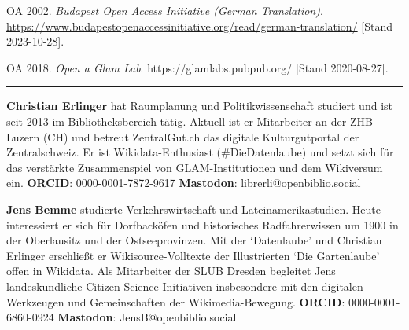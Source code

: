 \documentclass[a4paper,
fontsize=11pt,
oneside,
numbers=noperiodatend,
parskip=half-,
bibliography=totoc,
final
]{scrartcl}
\begin{document}
OA 2002. \emph{Budapest Open Access Initiative (German Translation)}.
\url{https://www.budapestopenaccessinitiative.org/read/german-translation/}
{[}Stand 2023-10-28{]}.

OA 2018. \emph{Open a Glam Lab}. https://glamlabs.pubpub.org/ {[}Stand
2020-08-27{]}.

\begin{center}\rule{0.5\linewidth}{0.5pt}\end{center}

\textbf{Christian Erlinger} hat Raumplanung und Politikwissenschaft
studiert und ist seit 2013 im Bibliotheksbereich tätig. Aktuell ist er
Mitarbeiter an der ZHB Luzern (CH) und betreut ZentralGut.ch das
digitale Kulturgutportal der Zentralschweiz. Er ist Wikidata-Enthusiast
(\#DieDatenlaube) und setzt sich für das verstärkte Zusammenspiel von
GLAM-Institutionen und dem Wikiversum ein. \textbf{ORCID}:
0000-0001-7872-9617 \textbar{} \textbf{Mastodon}:
librerli@openbiblio.social

\textbf{Jens Bemme} studierte Verkehrswirtschaft und
Lateinamerikastudien. Heute interessiert er sich für Dorfbacköfen und
historisches Radfahrerwissen um 1900 in der Oberlausitz und der
Ostseeprovinzen. Mit der `Datenlaube' und Christian Erlinger erschließt
er Wikisource-Volltexte der Illustrierten `Die Gartenlaube' offen in
Wikidata. Als Mitarbeiter der SLUB Dresden begleitet Jens
landeskundliche Citizen Science-Initiativen insbesondere mit den
digitalen Werkzeugen und Gemeinschaften der Wikimedia-Bewegung.
\textbf{ORCID}: 0000-0001-6860-0924 \textbar{} \textbf{Mastodon}:
JensB@openbiblio.social
\end{document}
